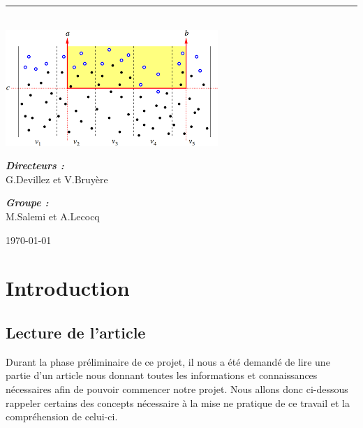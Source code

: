 \documentclass[10pt,a4paper]{article}
\newcommand{\HRule}{\rule{\linewidth}{0.5mm}}
\begin{document}
\begin{titlepage}
\begin{sffamily}
\begin{center}
    \HRule \\[2cm]
    \includegraphics[scale=0.50]{window.png}
    \\[2cm]

    \begin{minipage}{0.4\textwidth}
      \begin{flushleft} \large
        \emph{\textbf{Directeurs :}}\\ G.Devillez et V.Bruyère\\
      \end{flushleft}
    \end{minipage}
    \begin{minipage}{0.4\textwidth}
      \begin{flushright} \large
        \emph{\textbf{Groupe :}}\\ M.Salemi et A.Lecocq
      \end{flushright}
    \end{minipage}

    \vfill

    {\large \today}

  \end{center}
  \end{sffamily}
\end{titlepage}

\newpage
\tableofcontents
\newpage
\section{Introduction}
    

\subsection{Lecture de l'article}
Durant la phase préliminaire de ce projet, il nous a été demandé de lire une partie d'un article nous donnant toutes les informations et connaissances nécessaires afin de pouvoir commencer notre projet. Nous allons donc ci-dessous rappeler certains des concepts nécessaire à la mise ne pratique de ce travail et la compréhension de celui-ci.
\end{document}
